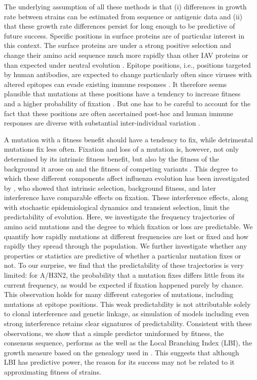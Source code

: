 \documentclass[reprint,amsmath,amssymb,superscriptaddress,showpacs,rmp]{revtex4-1}
\begin{document}
	The underlying assumption of all these methods is that (i) differences in growth rate between strains can be estimated from sequence or antigenic data and (ii) that these growth rate differences persist for long enough to be predictive of future success.
	Specific positions in surface proteins are of particular interest in this context.
	The surface proteins are under a strong positive selection and change their amino acid sequence much more rapidly than other IAV proteins or than expected under neutral evolution \citep{bhatt_genomic_2011,strelkowa_clonal_2012}.
	Epitope positions, i.e., positions targeted by human antibodies, are expected to change particularly often since viruses with altered epitopes can evade existing immune responses \citep{Koel976,wolf_long_2006,Shih6283}.
    It therefore seems plausible that mutations at these positions have a tendency to increase fitness and a higher probability of fixation \citep{strelkowa_clonal_2012}.
    But one has to be careful to account for the fact that these positions are often ascertained post-hoc \citep{Shih6283} and human immune responses are diverse with substantial inter-individual variation
    \citep{lee_mapping_2019}.

	A mutation with a fitness benefit should have a tendency to fix, while detrimental mutations fix less often.
	Fixation and loss of a mutation is, however, not only determined by its intrinsic fitness benefit, but also by the fitness of the background it arose on and the fitness of competing variants \citep{strelkowa_clonal_2012}.
	This degree to which these different components affect influenza evolution has been investigated by \citet{illingworth_components_2012}, who showed that intrinsic selection, background fitness, and later interference have comparable effects on fixation.
	These interference effects, along with stochastic epidemiological dynamics and transient selection, limit the predictability of evolution.
	Here, we investigate the frequency trajectories of amino acid mutations and the degree to which fixation or loss are predictable.
	We quantify how rapidly mutations at different frequencies are lost or fixed and how rapidly they spread through the population.
	We further investigate whether any properties or statistics are predictive of whether a particular mutation fixes or not.
	To our surprise, we find that the predictability of these trajectories is very limited: for A/H3N2, the probability that a mutation fixes differs little from its current frequency, as would be expected if fixation happened purely by chance.
	This observation holds for many different categories of mutations, including mutations at epitope positions.
	This weak predictability is not attributable solely to clonal interference and genetic linkage, as simulation of models including even strong interference retains clear signatures of predictability.
	Consistent with these observations, we show that a simple predictor uninformed by fitness, the consensus sequence, performs as the well as the Local Branching Index (LBI), the growth measure based on the genealogy used in \cite{neher_predicting_2014}.
	This suggests that although LBI has predictive power, the reason for its success may not be related to it approximating fitness of strains.
\end{document}
